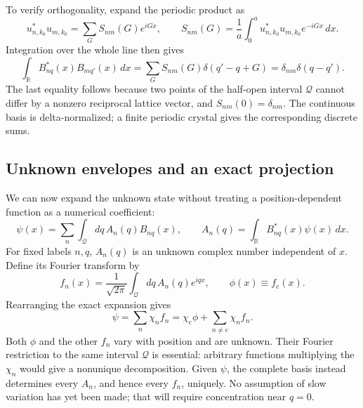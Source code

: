 To verify orthogonality, expand the periodic product as
\begin{equation}
  u_{n,k_0}^*u_{m,k_0}=\sum_G S_{nm}(G)e^{iGx},
  \qquad
  S_{nm}(G)=\frac1a\int_0^a
       u_{n,k_0}^*u_{m,k_0}e^{-iGx}\,dx.
  \label{eq:em-cell-product}
\end{equation}
Integration over the whole line then gives
\begin{equation}
  \int_{\mathbb R}B_{nq}^*(x)B_{mq'}(x)\,dx
    =\sum_G S_{nm}(G)\delta(q'-q+G)
    =\delta_{nm}\delta(q-q').
  \label{eq:em-global-orthogonality}
\end{equation}
The last equality follows because two points of the half-open
interval $\mathcal Q$ cannot differ by a nonzero reciprocal
lattice vector, and $S_{nm}(0)=\delta_{nm}$.
The continuous basis is delta-normalized; a finite periodic
crystal gives the corresponding discrete sums.

\subsection{Unknown envelopes and an exact projection}
\label{sec:em-exact-projection}

We can now expand the unknown state without treating a
position-dependent function as a numerical coefficient:
\begin{equation}
  \psi(x)=\sum_n\int_{\mathcal Q}dq\,A_n(q)B_{nq}(x),
  \qquad
  A_n(q)=\int_{\mathbb R}B_{nq}^*(x)\psi(x)\,dx.
  \label{eq:em-state-expansion}
\end{equation}
For fixed labels $n,q$, $A_n(q)$ is an unknown complex number
independent of $x$. Define its Fourier transform by
\begin{equation}
  f_n(x)=\frac{1}{\sqrt{2\pi}}\int_{\mathcal Q}dq\,
                          A_n(q)e^{iqx},
  \qquad \phi(x)\equiv f_{\mathrm c}(x).
  \label{eq:em-envelope-definition}
\end{equation}
Rearranging the exact expansion gives
\begin{equation}
  \psi=\sum_n\chi_nf_n
       =\chi_{\mathrm c}\phi+\sum_{n\ne\mathrm c}\chi_nf_n.
  \label{eq:em-multiband-reconstruction}
\end{equation}
Both $\phi$ and the other $f_n$ vary with position and are unknown.
Their Fourier restriction to the same interval $\mathcal Q$
is essential: arbitrary functions multiplying the $\chi_n$
would give a nonunique decomposition. Given $\psi$, the complete
basis instead determines every $A_n$, and hence every $f_n$,
uniquely. No assumption of slow variation has yet been made;
that will require concentration near $q=0$.

